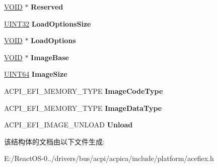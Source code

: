 \begin{DoxyCompactItemize}
\item 
\mbox{\label{struct_a_c_p_i___e_f_i___l_o_a_d_e_d___i_m_a_g_e_a8a99908d5ee4bce7c6b08978f2273cf4}} 
\hyperlink{interfacevoid}{V\+O\+ID} $\ast$ {\bfseries Reserved}
\item 
\mbox{\label{struct_a_c_p_i___e_f_i___l_o_a_d_e_d___i_m_a_g_e_a758f0528c8cec9bcb71ec5f4db3aeca9}} 
\hyperlink{_processor_bind_8h_ae1e6edbbc26d6fbc71a90190d0266018}{U\+I\+N\+T32} {\bfseries Load\+Options\+Size}
\item 
\mbox{\label{struct_a_c_p_i___e_f_i___l_o_a_d_e_d___i_m_a_g_e_a52764c020e2cf72bb92b1ead96c986ae}} 
\hyperlink{interfacevoid}{V\+O\+ID} $\ast$ {\bfseries Load\+Options}
\item 
\mbox{\label{struct_a_c_p_i___e_f_i___l_o_a_d_e_d___i_m_a_g_e_a5c3b4fedb9ce0c11dfd0fb5a2fb4be67}} 
\hyperlink{interfacevoid}{V\+O\+ID} $\ast$ {\bfseries Image\+Base}
\item 
\mbox{\label{struct_a_c_p_i___e_f_i___l_o_a_d_e_d___i_m_a_g_e_ab9094b2e50d7285ced6cf9daeeda97c5}} 
\hyperlink{_processor_bind_8h_a57be03562867144161c1bfee95ca8f7c}{U\+I\+N\+T64} {\bfseries Image\+Size}
\item 
\mbox{\label{struct_a_c_p_i___e_f_i___l_o_a_d_e_d___i_m_a_g_e_a3266c3e45c7e3d12e1462b9e57467286}} 
A\+C\+P\+I\+\_\+\+E\+F\+I\+\_\+\+M\+E\+M\+O\+R\+Y\+\_\+\+T\+Y\+PE {\bfseries Image\+Code\+Type}
\item 
\mbox{\label{struct_a_c_p_i___e_f_i___l_o_a_d_e_d___i_m_a_g_e_ad8f0565a336fe52c8059972d491865a4}} 
A\+C\+P\+I\+\_\+\+E\+F\+I\+\_\+\+M\+E\+M\+O\+R\+Y\+\_\+\+T\+Y\+PE {\bfseries Image\+Data\+Type}
\item 
\mbox{\label{struct_a_c_p_i___e_f_i___l_o_a_d_e_d___i_m_a_g_e_ae545f2a30a0c11618cceac5522075237}} 
A\+C\+P\+I\+\_\+\+E\+F\+I\+\_\+\+I\+M\+A\+G\+E\+\_\+\+U\+N\+L\+O\+AD {\bfseries Unload}
\end{DoxyCompactItemize}


该结构体的文档由以下文件生成\+:\begin{DoxyCompactItemize}
\item 
E\+:/\+React\+O\+S-\/0../drivers/bus/acpi/acpica/include/platform/acefiex.\+h\end{DoxyCompactItemize}
